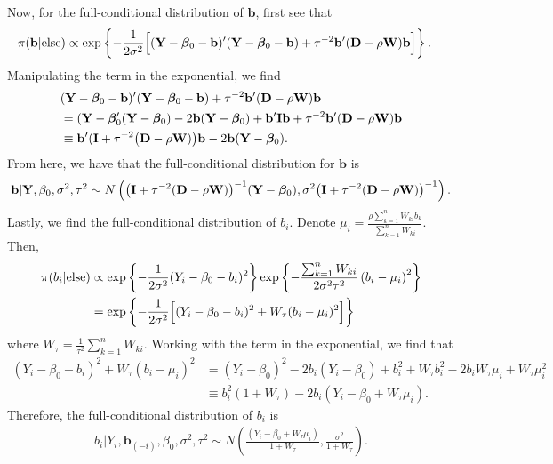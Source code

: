 \documentclass[11pt]{article}
\begin{document}
\begin{itemize}
\[\]
Now, for the full-conditional distribution of $\mathbf{b}$, first see that
\begin{align*}
\pi(\mathbf{b}|\text{else}) &\propto \exp\left\{-\frac{1}{2\sigma^2}\Big{[}(\mathbf{Y}-\boldsymbol\beta_0 - \mathbf{b})'(\mathbf{Y}-\boldsymbol\beta_0 - \mathbf{b})+\tau^{-2}\mathbf{b}'(\mathbf{D}-\rho\mathbf{W})\mathbf{b}\Big{]}\right\}.
\end{align*}
Manipulating the term in the exponential, we find
\begin{align*}
&(\mathbf{Y}-\boldsymbol\beta_0 - \mathbf{b})'(\mathbf{Y}-\boldsymbol\beta_0 - \mathbf{b})+\tau^{-2}\mathbf{b}'(\mathbf{D}-\rho\mathbf{W})\mathbf{b}  \\
&= (\mathbf{Y}-\boldsymbol\beta_0'(\mathbf{Y}-\boldsymbol\beta_0) - 2\mathbf{b}(\mathbf{Y}-\boldsymbol\beta_0) + \mathbf{b}'\mathbf{I}\mathbf{b} + \tau^{-2}\mathbf{b}'(\mathbf{D}-\rho\mathbf{W})\mathbf{b} \\
&\equiv \mathbf{b}'(\mathbf{I} + \tau^{-2}\big{(}\mathbf{D}-\rho\mathbf{W})\big{)}\mathbf{b} - 2\mathbf{b}(\mathbf{Y}-\boldsymbol\beta_0).
\end{align*}
From here, we have that the full-conditional distribution for $\mathbf{b}$ is
\[
\mathbf{b}|\mathbf{Y},\beta_0,\sigma^2,\tau^2\sim N\left(\big{(}\mathbf{I} + \tau^{-2}(\mathbf{D}-\rho\mathbf{W})\big{)}^{-1}(\mathbf{Y}-\boldsymbol\beta_0), \sigma^2\big{(}\mathbf{I} + \tau^{-2}(\mathbf{D}-\rho\mathbf{W})\big{)}^{-1}\right).
\]
Lastly, we find the full-conditional distribution of $b_i$.  Denote $\mu_i = \frac{\rho\sum_{k=1}^nW_{ki}b_k}{\sum_{k=1}^nW_{ki}}$.  Then,
\begin{align*}
\pi(b_i|\text{else}) &\propto \exp\left\{-\frac{1}{2\sigma^2}(Y_i-\beta_0 - b_i)^2\right\}\exp\left\{-\frac{\sum_{k=1}^nW_{ki}}{2\sigma^2\tau^2}\left(b_i - \mu_i\right)^2\right\} \\
&= \exp\left\{-\frac{1}{2\sigma^2}\Big{[}(Y_i-\beta_0-b_i)^2 + W_\tau(b_i-\mu_i)^2\Big{]}\right\}
\end{align*}
where $W_\tau = \frac{1}{\tau^2}\sum_{k=1}^n W_{ki}$.  Working with the term in the exponential, we find that
\begin{align*}
(Y_i-\beta_0-b_i)^2 + W_\tau(b_i-\mu_i)^2 &= (Y_i - \beta_0)^2 - 2b_i(Y_i-\beta_0) + b_i^2 + W_\tau b_i^2 - 2b_iW_\tau\mu_i + W_\tau\mu_i^2 \\
&\equiv b_i^2(1+W_\tau) - 2b_i(Y_i-\beta_0 + W_\tau\mu_i).
\end{align*}
Therefore, the full-conditional distribution of $b_i$ is
\begin{align*}
b_i|Y_i,\mathbf{b}_{(-i)},\beta_0,\sigma^2,\tau^2 \sim N\left(\frac{(Y_i-\beta_0 + W_\tau\mu_i)}{1+W_\tau},\frac{\sigma^2}{1+W_\tau}\right).
\end{align*}


\end{itemize}
\end{document}
